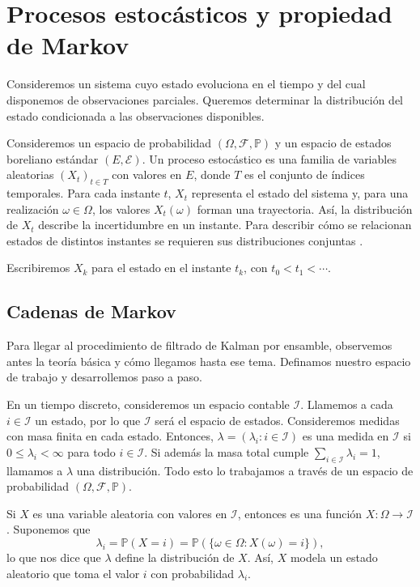 \chapter{Procesos estocásticos y propiedad de Markov }
\label{cap:procesos_estocasticos}

Consideremos un sistema cuyo estado evoluciona en el tiempo y del cual disponemos de observaciones parciales. Queremos determinar la distribución del estado condicionada a las observaciones disponibles.

Consideremos un espacio de probabilidad $(\Omega,\mathcal F,\mathbb P)$ y un espacio de estados boreliano estándar $(E,\mathcal E)$. Un proceso estocástico es una familia de variables aleatorias $(X_t)_{t\in T}$ con valores en $E$, donde $T$ es el conjunto de índices temporales. Para cada instante $t$, $X_t$ representa el estado del sistema y, para una realización $\omega\in\Omega$, los valores $X_t(\omega)$ forman una trayectoria. Así, la distribución de $X_t$ describe la incertidumbre en un instante. Para describir cómo se relacionan estados de distintos instantes se requieren sus distribuciones conjuntas \cite{durrett2019}\label{cita:durrett2019}.

Escribiremos $X_k$ para el estado en el instante $t_k$, con $t_0<t_1<\cdots$.

\section{Cadenas de Markov}
Para llegar al procedimiento de filtrado de Kalman por ensamble, observemos antes la teoría básica y cómo llegamos hasta ese tema. Definamos nuestro espacio de trabajo y desarrollemos paso a paso.

En un tiempo discreto, consideremos un espacio contable $\mathcal I$. Llamemos a cada $i \in \mathcal I$ un estado, por lo que $\mathcal I$ será el espacio de estados. Consideremos medidas con masa finita en cada estado. Entonces, $\lambda = (\lambda_i : i \in \mathcal I)$ es una medida en $\mathcal I$ si $0 \leq \lambda_i < \infty$ para todo $i \in \mathcal I$. Si además la masa total cumple $\sum_{i \in \mathcal I} \lambda_i = 1$, llamamos a $\lambda$ una distribución. Todo esto lo trabajamos a través de un espacio de probabilidad $(\Omega, \mathcal{F}, \mathbb P)$.

Si $X$ es una variable aleatoria con valores en $\mathcal I$, entonces es una función $X: \Omega \rightarrow \mathcal I$. Suponemos que
\[
\lambda_i = \mathbb P(X = i) = \mathbb P(\{\omega \in \Omega : X(\omega) = i\}),
\]
lo que nos dice que $\lambda$ define la distribución de $X$. Así, $X$ modela un estado aleatorio que toma el valor $i$ con probabilidad $\lambda_i$.

